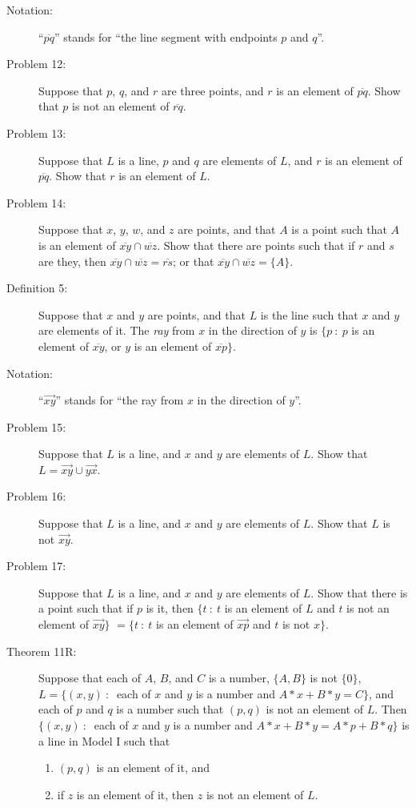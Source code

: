 \documentclass{article}
\begin{document}
\begin{description}
  \item[Notation:] ``$\overline{pq}$'' stands for ``the line segment with endpoints $p$ and $q$''.

  \item[Problem 12:] Suppose that $p$, $q$, and $r$ are three points, and $r$ is an element of $\overline{pq}$. Show that $p$ is not an element of $\overline{rq}$.

  \item[Problem 13:] Suppose that $L$ is a line, $p$ and $q$ are elements of $L$, and $r$ is an element of $\overline{pq}$. Show that $r$ is an element of $L$.

  \item[Problem 14:] Suppose that $x$, $y$, $w$, and $z$ are points, and that $A$ is a point such that $A$ is an element of $\overline{xy} \cap \overline{wz}$. Show that there are points such that if $r$ and $s$ are they, then $\overline{xy} \cap \overline{wz} = \overline{rs}$; or that $\overline{xy} \cap \overline{wz} = \{ A \}$.

  \item[Definition 5:] Suppose that $x$ and $y$ are points, and that $L$ is the line such that $x$ and $y$ are elements of it. The \emph{ray} from $x$ in the direction of $y$ is $\{ p\ :\ p$ is an element of $\overline{xy}$, or $y$ is an element of $\overline{xp} \}$.

  \item[Notation:] ``$\overrightarrow{xy}$'' stands for ``the ray from $x$ in the direction of $y$''.

  \item[Problem 15:] Suppose that $L$ is a line, and $x$ and $y$ are elements of $L$. Show that $L = \overrightarrow{xy} \cup \overrightarrow{yx}$.

  \item[Problem 16:] Suppose that $L$ is a line, and $x$ and $y$ are elements of $L$. Show that $L$ is not $\overrightarrow{xy}$.

  \item[Problem 17:] Suppose that $L$ is a line, and $x$ and $y$ are elements of $L$. Show that there is a point such that if $p$ is it, then $\{ t\ :\ t$ is an element of $L$ and $t$ is not an element of $\overrightarrow{xy} \}$ $= \{ t\ :\ t$ is an element of $\overrightarrow{xp}$ and $t$ is not $x \}$.

  \item[Theorem 11R:] Suppose that each of $A$, $B$, and $C$ is a number, $\{ A,B \}$ is not $\{ 0 \}$, $L = \{ (x,y)\ :\ $ each of $x$ and $y$ is a number and $A*x + B*y = C \}$, and each of $p$ and $q$ is a number such that $(p,q)$ is not an element of $L$. Then $\{ (x,y)\ :\ $ each of $x$ and $y$ is a number and $A*x + B*y = A*p + B*q \}$ is a line in Model I such that
    \begin{enumerate}[\hspace{1cm}(i.)]
      \item $(p,q)$ is an element of it, and
      \item if $z$ is an element of it, then $z$ is not an element of $L$.
    \end{enumerate}


\end{description}
\end{document}
